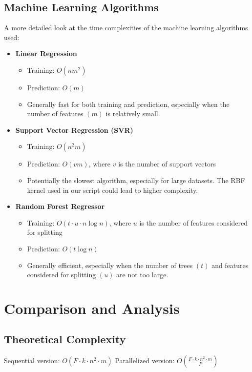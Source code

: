 \documentclass[11pt,a4paper]{article}
\begin{document}
\subsection{Machine Learning Algorithms}
A more detailed look at the time complexities of the machine learning algorithms used:

\begin{itemize}
    \item \textbf{Linear Regression}
    \begin{itemize}
        \item Training: $O(nm^2)$
        \item Prediction: $O(m)$
        \item Generally fast for both training and prediction, especially when the number of features $(m)$ is relatively small.
    \end{itemize}
    
    \item \textbf{Support Vector Regression (SVR)}
    \begin{itemize}
        \item Training: $O(n^2m)$
        \item Prediction: $O(vm)$, where $v$ is the number of support vectors
        \item Potentially the slowest algorithm, especially for large datasets. The RBF kernel used in our script could lead to higher complexity.
    \end{itemize}
    
    \item \textbf{Random Forest Regressor}
    \begin{itemize}
        \item Training: $O(t \cdot u \cdot n \log n)$, where $u$ is the number of features considered for splitting
        \item Prediction: $O(t \log n)$
        \item Generally efficient, especially when the number of trees $(t)$ and features considered for splitting $(u)$ are not too large.
    \end{itemize}
\end{itemize}

\section{Comparison and Analysis}

\subsection{Theoretical Complexity}
Sequential version: $O(F \cdot k \cdot n^2 \cdot m)$
Parallelized version: $O(\frac{F \cdot k \cdot n^2 \cdot m}{P})$
\end{document}
